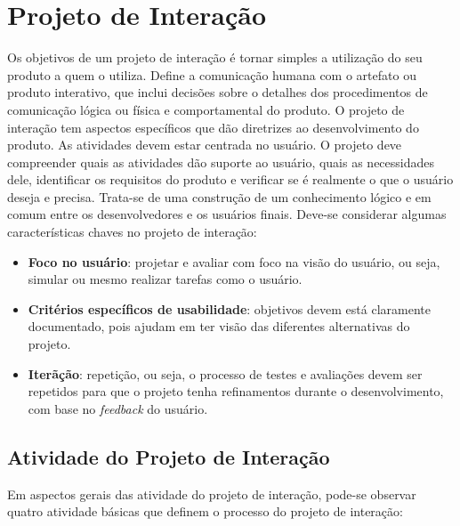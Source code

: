 \chapter[Projeto de Interação]{Projeto de Interação}

Os objetivos de um projeto de interação é tornar simples a utilização do seu produto a quem o utiliza. Define a comunicação humana com o artefato ou produto interativo, que inclui decisões sobre o detalhes dos procedimentos de comunicação lógica ou física e comportamental do produto.
O projeto de interação tem aspectos específicos que dão diretrizes ao desenvolvimento do produto. As atividades devem estar centrada no usuário. O projeto deve compreender quais as atividades dão suporte ao usuário, quais as necessidades dele, identificar os requisitos do produto e verificar se é realmente o que o usuário deseja e precisa. Trata-se de uma construção de um conhecimento lógico e em comum entre os desenvolvedores e os usuários finais.
Deve-se considerar algumas características chaves no projeto de interação:
\begin{itemize}
	\item \textbf{Foco no usuário}: projetar e avaliar com foco na visão do usuário, ou seja, simular ou mesmo realizar tarefas como o usuário.
	\item \textbf{Critérios específicos de usabilidade}: objetivos devem está claramente documentado, pois ajudam em ter visão das diferentes alternativas do projeto.
	\item \textbf{Iterãção}: repetição, ou seja, o processo de testes e avaliações devem ser repetidos para que o projeto tenha refinamentos durante o desenvolvimento, com base no \textit{feedback} do usuário.
\end{itemize}

\section{Atividade do Projeto de Interação}

Em aspectos gerais das atividade do projeto de interação, pode-se observar quatro atividade básicas que definem o processo do projeto de interação:

